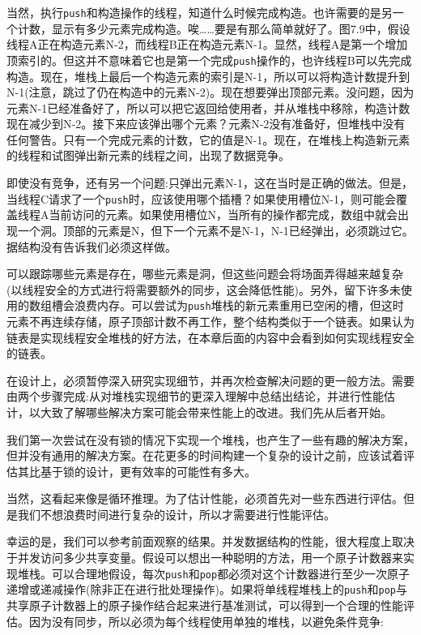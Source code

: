 当然，执行\texttt{push}和构造操作的线程，知道什么时候完成构造。也许需要的是另一个计数，显示有多少元素完成构造。唉……要是有那么简单就好了。图7.9中，假设线程A正在构造元素N-2，而线程B正在构造元素N-1。显然，线程A是第一个增加顶索引的。但这并不意味着它也是第一个完成\texttt{push}操作的，也许线程B可以先完成构造。现在，堆栈上最后一个构造元素的索引是N-1，所以可以将构造计数提升到N-1(注意，跳过了仍在构造中的元素N-2)。现在想要弹出顶部元素。没问题，因为元素N-1已经准备好了，所以可以把它返回给使用者，并从堆栈中移除，构造计数现在减少到N-2。接下来应该弹出哪个元素？元素N-2没有准备好，但堆栈中没有任何警告。只有一个完成元素的计数，它的值是N-1。现在，在堆栈上构造新元素的线程和试图弹出新元素的线程之间，出现了数据竞争。

即使没有竞争，还有另一个问题:只弹出元素N-1，这在当时是正确的做法。但是，当线程C请求了一个\texttt{push}时，应该使用哪个插槽？如果使用槽位N-1，则可能会覆盖线程A当前访问的元素。如果使用槽位N，当所有的操作都完成，数组中就会出现一个洞。顶部的元素是N，但下一个元素不是N-1，N-1已经弹出，必须跳过它。据结构没有告诉我们必须这样做。

可以跟踪哪些元素是存在，哪些元素是洞，但这些问题会将场面弄得越来越复杂(以线程安全的方式进行将需要额外的同步，这会降低性能)。另外，留下许多未使用的数组槽会浪费内存。可以尝试为\texttt{push}堆栈的新元素重用已空闲的槽，但这时元素不再连续存储，原子顶部计数不再工作，整个结构类似于一个链表。如果认为链表是实现线程安全堆栈的好方法，在本章后面的内容中会看到如何实现线程安全的链表。

在设计上，必须暂停深入研究实现细节，并再次检查解决问题的更一般方法。需要由两个步骤完成:从对堆栈实现细节的更深入理解中总结出结论，并进行性能估计，以大致了解哪些解决方案可能会带来性能上的改进。我们先从后者开始。


我们第一次尝试在没有锁的情况下实现一个堆栈，也产生了一些有趣的解决方案，但并没有通用的解决方案。在花更多的时间构建一个复杂的设计之前，应该试着评估其比基于锁的设计，更有效率的可能性有多大。

当然，这看起来像是循环推理。为了估计性能，必须首先对一些东西进行评估。但是我们不想浪费时间进行复杂的设计，所以才需要进行性能评估。

幸运的是，我们可以参考前面观察的结果。并发数据结构的性能，很大程度上取决于并发访问多少共享变量。假设可以想出一种聪明的方法，用一个原子计数器来实现堆栈。可以合理地假设，每次\texttt{push}和\texttt{pop}都必须对这个计数器进行至少一次原子递增或递减操作(除非正在进行批处理操作)。如果将单线程堆栈上的\texttt{push}和\texttt{pop}与共享原子计数器上的原子操作结合起来进行基准测试，可以得到一个合理的性能评估。因为没有同步，所以必须为每个线程使用单独的堆栈，以避免条件竞争:

